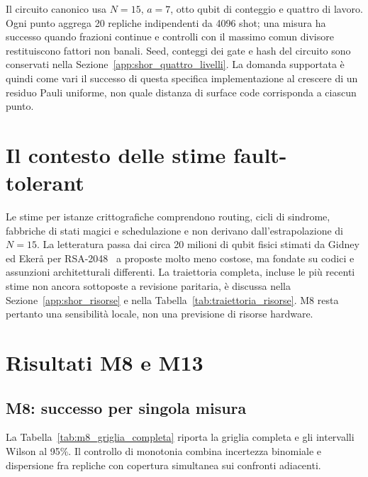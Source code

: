 \begin{onehalfspace}
Il circuito canonico usa $N=15$, $a=7$, otto qubit di conteggio e quattro di
lavoro. Ogni punto aggrega 20 repliche indipendenti da 4096 shot; una misura ha
successo quando frazioni continue e controlli con il massimo comun divisore
restituiscono fattori non banali. Seed, conteggi dei gate e hash del circuito
sono conservati nella Sezione~\ref{app:shor_quattro_livelli}. La domanda
supportata \`e quindi come vari il successo di questa specifica implementazione
al crescere di un residuo Pauli uniforme, non quale distanza di surface code
corrisponda a ciascun punto.

\section{Il contesto delle stime fault-tolerant}
\label{sec:resource_estimates}

Le stime per istanze crittografiche comprendono routing, cicli di sindrome,
fabbriche di stati magici e schedulazione e non derivano dall'estrapolazione di
$N=15$. La letteratura passa dai circa 20 milioni di qubit fisici stimati da
Gidney ed Eker\aa{} per RSA-2048~\cite{gidney2021} a proposte molto meno
costose, ma fondate su codici e assunzioni architetturali differenti. La
traiettoria completa, incluse le pi\`u recenti stime non ancora sottoposte a
revisione paritaria, \`e discussa nella Sezione~\ref{app:shor_risorse} e nella
Tabella~\ref{tab:traiettoria_risorse}. M8 resta pertanto una sensibilit\`a locale,
non una previsione di risorse hardware.

\section{Risultati M8 e M13}
\label{sec:risultati_logico}

\subsection*{M8: successo per singola misura}

La Tabella~\ref{tab:m8_griglia_completa} riporta la griglia completa e gli
intervalli Wilson al 95\%. Il controllo di monotonia combina incertezza
binomiale e dispersione fra repliche con copertura simultanea sui confronti
adiacenti.


\end{onehalfspace}
